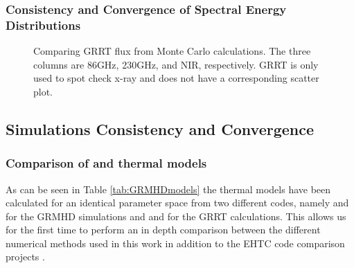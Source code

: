 \subsubsection{Consistency and Convergence of Spectral Energy Distributions}


\begin{figure}
    \centering
    \caption{Comparing GRRT flux from Monte Carlo calculations.  The three columns are 86GHz, 230GHz, and NIR, respectively.  GRRT is only used to spot check x-ray and does not have a corresponding scatter plot.}
    \label{fig:sed_vv}
\end{figure}

\subsection{Simulations Consistency and Convergence}\label{app:resolution_study}

\subsubsection{Comparison of \kharma and \bhac thermal models}

As can be seen in Table \ref{tab:GRMHDmodels} the thermal models have been calculated for an identical parameter space from two different codes, namely \kharma and \bhac for the GRMHD simulations and \ipole and \bhoss for the GRRT calculations. This allows us for the first time to perform an in depth comparison between the different numerical methods used in this work in addition to the EHTC code comparison projects \citep{2019ApJS..243...26P,2020ApJ...897..148G}.

